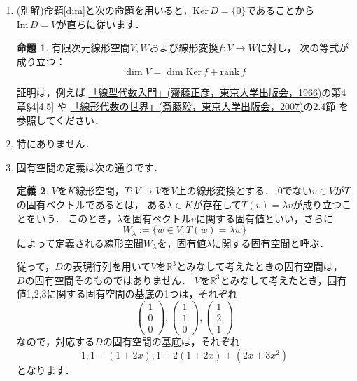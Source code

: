 \documentclass{jsarticle}
\theoremstyle{definition}
\newtheorem{defi}{定義}[section]
\newtheorem{prop}[defi]{命題}
\begin{document}
\begin{enumerate}
\item(別解)命題\ref{dim}と次の命題を用いると，$\mathrm{Ker}\,D=\{0\}$であることから
$\mathrm{Im}\,D=V$が直ちに従います．

\begin{prop}
有限次元線形空間$V,W$および線形変換$f\colon V\to W$に対し，
次の等式が成り立つ：
\[ \dim{V}=\dim\mathrm{Ker}\,f+\mathrm{rank}\,f \]
\end{prop}

証明は，例えば
\href{http://www.utp.or.jp/book/b302039.html}{「線型代数入門」(齋藤正彦，東京大学出版会，1966)}の第4章\S4[4.5]
や
\href{http://www.utp.or.jp/book/b305671.html}{「線形代数の世界」(斎藤毅，東京大学出版会，2007)}の2.4節
を参照してください．

\item 特にありません．

\item 固有空間の定義は次の通りです．

\begin{defi}
$V$を$K$線形空間，$T: V\to V$を$V$上の線形変換とする．
0でない$v\in V$が$T$の固有ベクトルであるとは，
ある$\lambda\in K$が存在して$T(v)=\lambda v$が成り立つことをいう．
このとき，$\lambda$を固有ベクトル$v$に関する固有値といい，さらに
\[ W_\lambda:=\{w\in V:T(w)=\lambda w\} \]
によって定義される線形空間$W_\lambda$を，固有値$\lambda$に関する固有空間と呼ぶ．
\end{defi}

従って，$D$の表現行列を用いて$V$を$\mathbb{R}^3$とみなして考えたときの固有空間は，
$D$の固有空間そのものではありません．
$V$を$\mathbb{R}^3$とみなして考えたとき，固有値1,2,3に関する固有空間の基底の1つは，それぞれ
\[ \begin{pmatrix}1\\0\\0\end{pmatrix},\begin{pmatrix}1\\1\\0\end{pmatrix},
\begin{pmatrix}1\\2\\1\end{pmatrix} \]
なので，対応する$D$の固有空間の基底は，それぞれ
\[ 1,1+(1+2x),1+2(1+2x)+(2x+3x^2) \]
となります．
\end{enumerate}
\end{document}
